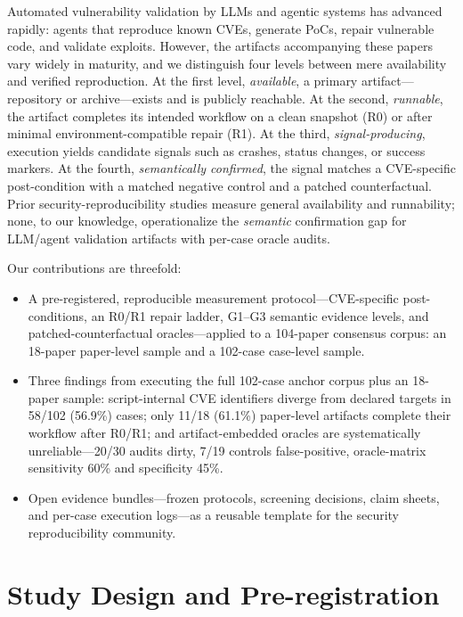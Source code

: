\documentclass[11pt]{article}
\begin{document}
Automated vulnerability validation by LLMs and agentic systems has advanced rapidly: agents that reproduce known CVEs, generate PoCs, repair vulnerable code, and validate exploits. However, the artifacts accompanying these papers vary widely in maturity, and we distinguish four levels between mere availability and verified reproduction. At the first level, \emph{available}, a primary artifact---repository or archive---exists and is publicly reachable. At the second, \emph{runnable}, the artifact completes its intended workflow on a clean snapshot (R0) or after minimal environment-compatible repair (R1). At the third, \emph{signal-producing}, execution yields candidate signals such as crashes, status changes, or success markers. At the fourth, \emph{semantically confirmed}, the signal matches a CVE-specific post-condition with a matched negative control and a patched counterfactual. Prior security-reproducibility studies measure general availability and runnability; none, to our knowledge, operationalize the \emph{semantic} confirmation gap for LLM/agent validation artifacts with per-case oracle audits.

Our contributions are threefold:
\begin{itemize}
\item A pre-registered, reproducible measurement protocol---CVE-specific post-conditions, an R0/R1 repair ladder, G1--G3 semantic evidence levels, and patched-counterfactual oracles---applied to a 104-paper consensus corpus: an 18-paper paper-level sample and a 102-case case-level sample.
\item Three findings from executing the full 102-case anchor corpus plus an 18-paper sample: script-internal CVE identifiers diverge from declared targets in 58/102 (56.9\%) cases; only 11/18 (61.1\%) paper-level artifacts complete their workflow after R0/R1; and artifact-embedded oracles are systematically unreliable---20/30 audits dirty, 7/19 controls false-positive, oracle-matrix sensitivity 60\% and specificity 45\%.
\item Open evidence bundles---frozen protocols, screening decisions, claim sheets, and per-case execution logs---as a reusable template for the security reproducibility community.
\end{itemize}

\section{Study Design and Pre-registration}
\label{sec:design}
\end{document}
